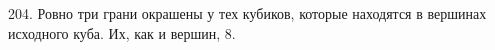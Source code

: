 204. Ровно три грани окрашены у тех кубиков, которые находятся в вершинах исходного куба. Их, как и вершин, 8.\\
